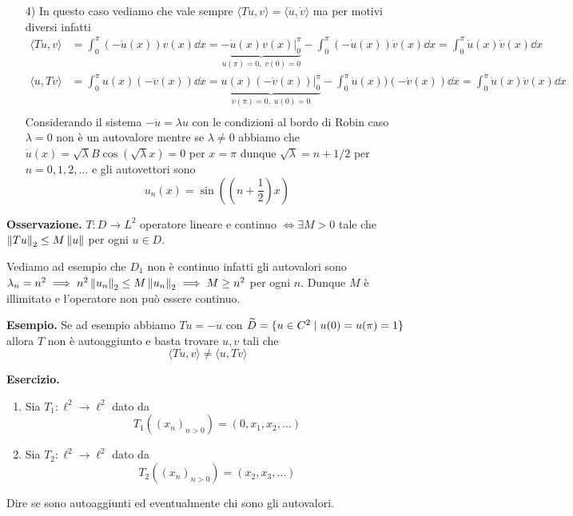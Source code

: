 \begin{enumerate}
	\item[4)]
		In questo caso vediamo che vale sempre $\langle Tu, v \rangle = \langle \dot u, \dot v \rangle$ ma per motivi diversi infatti
		$$
		\begin{aligned}
			\langle Tu, v \rangle 
			&= \int_0^\pi (-\ddot u(x)) v(x) \dd x 
			= \underbrace{-\dot u(x) v(x) \bigg|_0^\pi}_{\dot u(\pi) = 0, \; v(0) = 0} - \int_0^\pi (-\dot u(x)) \dot v(x) \dd x 
			= \int_0^\pi \dot u(x) \dot v(x) \dd x \\
			\langle u, Tv \rangle 
			&= \int_0^\pi u(x) (-\ddot v(x)) \dd x 
			= \underbrace{u(x) (-\dot v(x)) \bigg|_0^\pi}_{\dot v(\pi) = 0, \; u(0) = 0} - \int_0^\pi \dot u(x)) (-\dot v(x)) \dd x 
			= \int_0^\pi \dot u(x) \dot v(x) \dd x \\
		\end{aligned}
		$$
		Considerando il sistema $-\ddot u = \lambda u$ con le condizioni al bordo di Robin caso $\lambda = 0$ non è un autovalore mentre se $\lambda \neq 0$ abbiamo che $\dot u(x) = \sqrt{\lambda} B \cos(\sqrt{\lambda} x) = 0$ per $x = \pi$ dunque $\sqrt{\lambda} = n + 1/2$ per $n = 0, 1, 2, \dots$ e gli autovettori sono
		$$
		u_n(x) = \sin\left(\left( n + \frac{1}{2} \right)x\right)
		$$
\end{enumerate}

\textbf{Osservazione.}
$T \colon D \to L^2$ operatore lineare e continuo $\iff \exists M > 0$ tale che $\left\lVert Tu \right\rVert_2 \leq M\left\lVert u \right\rVert$ per ogni $u \in D$.

Vediamo ad esempio che $D_1$ non è continuo infatti gli autovalori sono $\lambda_n = n^2 \implies n^2 \left\lVert u_n \right\rVert_2 \leq M \left\lVert u_n \right\rVert_2 \implies M \geq n^2$ per ogni $n$. Dunque $M$ è illimitato e l'operatore non può essere continuo.

\textbf{Esempio.} Se ad esempio abbiamo $T u = -\ddot u$ con $\widetilde D = \{ u \in C^2 \mid u(0) = u(\pi) = 1 \}$ allora $T$ non è autoaggiunto e basta trovare $u, v$ tali che
$$
\langle T u, v \rangle \neq \langle u, T v \rangle
$$

\textbf{Esercizio.}
\begin{enumerate}
	\item Sia $T_1 \colon \ell^2 \to \ell^2$ dato da
		$$
		T_1((x_n)_{n > 0}) = (0, x_1, x_2, \dots)
		$$
	\item Sia $T_2 \colon \ell^2 \to \ell^2$ dato da
		$$
		T_2((x_n)_{n > 0}) = (x_2, x_3, \dots)
		$$
\end{enumerate}
Dire se sono autoaggiunti ed eventualmente chi sono gli autovalori.

